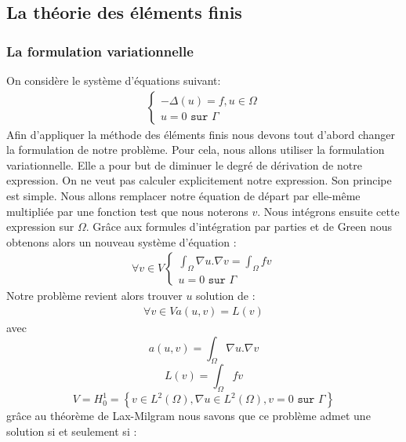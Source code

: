\subsection{La théorie des éléments finis}
\subsubsection{La formulation variationnelle}
On considère le système d'équations suivant:
\begin{align*}
\left\{\begin{matrix}
-\Delta\left(u\right)=f,  u\in\Omega\\
u=0 \texttt{ sur }\Gamma
\end{matrix}
 \right.
\end{align*}
Afin d'appliquer la méthode des éléments finis nous devons tout d'abord changer la formulation de notre problème. Pour cela, nous allons utiliser la formulation variationnelle. Elle a pour but de diminuer le degré de dérivation de notre expression. On ne veut pas calculer explicitement notre expression. Son principe est simple. Nous allons remplacer notre équation de départ par  elle-même multipliée par une fonction test que nous noterons $v$. Nous intégrons ensuite cette expression sur $\Omega$. Gr\^ace aux formules d'intégration par parties et de Green nous obtenons alors un nouveau système d'équation : \\
\begin{align*}
\forall v\in V \left\{ \begin{matrix}
\int_{\Omega}\nabla u.\nabla v =\int_{\Omega}fv\\
u=0 \texttt{ sur } \Gamma
\end{matrix}\right.
\end{align*}
Notre problème revient alors trouver $u$ solution de :\\
\begin{align*}
\forall v\in V a(u,v)=L(v)
\end{align*}
avec
\begin{equation*}
a(u,v)=\int_{\Omega}\nabla u.\nabla v
\end{equation*}
\begin{equation*}
L(v)=\int_{\Omega}fv
\end{equation*}
\begin{equation*}
V=H_{0}^{1}=\left\{v\in L^{2}\left(\Omega\right), \nabla u\in L^{2}\left(\Omega\right), v=0 \texttt{ sur }\Gamma\right\}
\end{equation*}
gr\^ace au théorème de Lax-Milgram nous savons que ce problème admet une solution si et seulement si :\\
